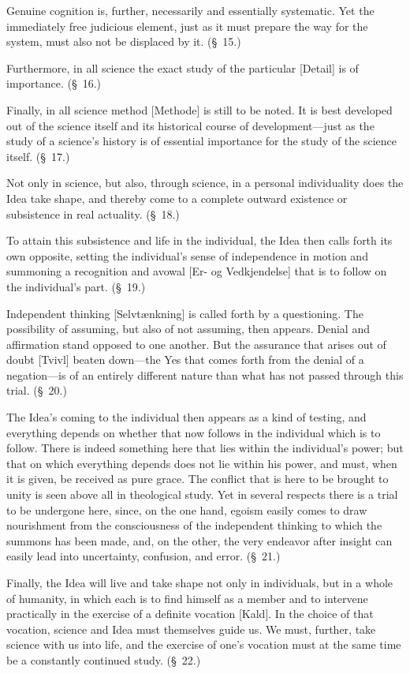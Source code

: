 \documentclass[12pt,a4paper]{book}
\begin{document}
Genuine cognition is, further, necessarily and essentially systematic. Yet the
immediately free judicious element, just as it must prepare the way for the
system, must also not be displaced by it. (\S~15.)

Furthermore, in all science the exact study of the particular [Detail] is of
importance. (\S~16.)

Finally, in all science method [Methode] is still to be noted. It is best
developed out of the science itself and its historical course of
development---just as the study of a science's history is of essential
importance for the study of the science itself. (\S~17.)

Not only in science, but also, through science, in a personal individuality does
the Idea take shape, and thereby come to a complete outward existence or
subsistence in real actuality. (\S~18.)

To attain this subsistence and life in the individual, the Idea then calls forth
its own opposite, setting the individual's sense of independence in motion and
summoning a recognition and avowal [Er- og Vedkjendelse] that is to follow on
the individual's part. (\S~19.)

Independent thinking [Selvtænkning] is called forth by a questioning. The
possibility of assuming, but also of not assuming, then appears. Denial and
affirmation stand opposed to one another. But the assurance that arises out of
doubt [Tvivl] beaten down---the Yes that comes forth from the denial of a
negation---is of an entirely different nature than what has not passed through
this trial. (\S~20.)

The Idea's coming to the individual then appears as a kind of testing, and
everything depends on whether that now follows in the individual which is to
follow. There is indeed something here that lies within the individual's power;
but that on which everything depends does not lie within his power, and must,
when it is given, be received as pure grace. The conflict that is here to be
brought to unity is seen above all in theological study. Yet in several respects
there is a trial to be undergone here, since, on the one hand, egoism easily
comes to draw nourishment from the consciousness of the independent thinking to
which the summons has been made, and, on the other, the very endeavor after
insight can easily lead into uncertainty, confusion, and error. (\S~21.)

Finally, the Idea will live and take shape not only in individuals, but in a
whole of humanity, in which each is to find himself as a member and to intervene
practically in the exercise of a definite vocation [Kald]. In the choice of that
vocation, science and Idea must themselves guide us. We must, further, take
science with us into life, and the exercise of one's vocation must at the same
time be a constantly continued study. (\S~22.)
\end{document}
